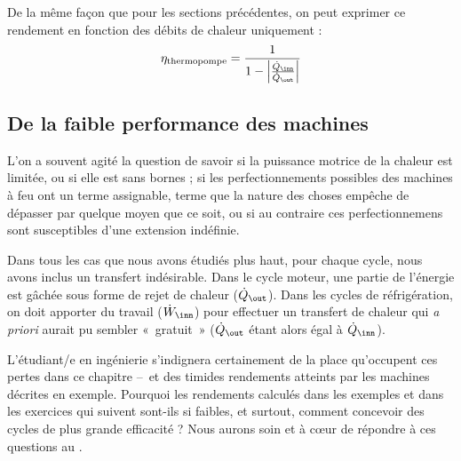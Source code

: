 		De la même façon que pour les sections précédentes, on peut exprimer ce rendement en fonction des débits de chaleur uniquement :
		\begin{equation}
			\eta_\text{thermopompe} = \frac{1}{1 - \left| \frac{\dot Q_\inn}{\dot Q_\out} \right|}
			\label{eq_rendement_thermopompe_qin_qout}
		\end{equation}




	\subsection{De la faible performance des machines}

			L’on a souvent agité la question de savoir si la puissance motrice de la chaleur est limitée, ou si elle est sans bornes ; si les perfectionnements possibles des machines à feu ont un terme assignable, terme que la nature des choses empêche de dépasser par quelque moyen que ce soit, ou si au contraire ces perfectionnemens sont susceptibles d’une extension indéfinie.

		Dans tous les cas que nous avons étudiés plus haut, pour chaque cycle, nous avons inclus un transfert indésirable. Dans le cycle moteur, une partie de l’énergie est gâchée sous forme de rejet de chaleur ($\dot Q_\out$). Dans les cycles de réfrigération, on doit apporter du travail ($\dot W_\inn$) pour effectuer un transfert de chaleur qui \textit{a priori} aurait pu sembler «~gratuit~» ($\dot Q_\out$ étant alors égal à $\dot Q_\inn$).

		L’étudiant/e en ingénierie s’indignera certainement de la place qu’occupent ces pertes dans ce chapitre --\ et des timides rendements atteints par les machines décrites en exemple. Pourquoi les rendements calculés dans les exemples et dans les exercices qui suivent sont-ils si faibles, et surtout, comment concevoir des cycles de plus grande efficacité ? Nous aurons soin et à cœur de répondre à ces questions au \courssept.
